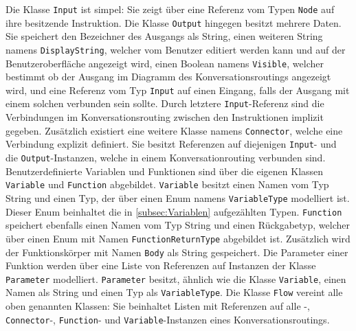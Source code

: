 Die Klasse \texttt{Input} ist simpel: Sie zeigt über eine Referenz vom Typen \texttt{Node} auf ihre besitzende Instruktion. Die Klasse \texttt{Output} hingegen besitzt mehrere Daten. Sie speichert den Bezeichner des Ausgangs als String, einen weiteren String namens \texttt{DisplayString}, welcher vom Benutzer editiert werden kann und auf der Benutzeroberfläche angezeigt wird, einen Boolean namens \texttt{Visible}, welcher bestimmt ob der Ausgang im Diagramm des Konversationsroutings angezeigt wird, und eine Referenz vom Typ \texttt{Input} auf einen Eingang, falls der Ausgang mit einem solchen verbunden sein sollte. Durch letztere \texttt{Input}-Referenz sind die Verbindungen im Konversationsrouting zwischen den Instruktionen implizit gegeben. Zusätzlich existiert eine weitere Klasse namens \texttt{Connector}, welche eine Verbindung explizit definiert. Sie besitzt Referenzen auf diejenigen \texttt{Input}- und die \texttt{Output}-Instanzen, welche in einem Konversationrouting verbunden sind.
\newline
Benutzerdefinierte Variablen und Funktionen sind über die eigenen Klassen \texttt{Va\-ri\-a\-ble} und \texttt{Function} abgebildet. \texttt{Variable} besitzt einen Namen vom Typ String und einen Typ, der über einen Enum namens \texttt{VariableType} modelliert ist. Dieser Enum beinhaltet die in \ref{subsec:Variablen} aufgezählten Typen. \texttt{Function} speichert ebenfalls einen Namen vom Typ String und einen Rückgabetyp, welcher über einen Enum mit Namen \texttt{FunctionReturnType} abgebildet ist. Zusätzlich wird der Funktionskörper mit Namen \texttt{Body} als String gespeichert. Die Parameter einer Funktion werden über eine Liste von Referenzen auf Instanzen der Klasse \texttt{Parameter} modelliert. \texttt{Parameter} besitzt, ähnlich wie die Klasse \texttt{Variable}, einen Namen als String und einen Typ als \texttt{VariableType}. Die Klasse \texttt{Flow} vereint alle oben genannten Klassen: Sie beinhaltet Listen mit Referenzen auf alle -, \texttt{Connector}-, \texttt{Function}- und \texttt{Variable}-Instanzen eines Konversationsroutings. 



